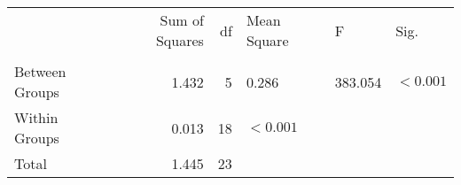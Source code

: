 \begin{tabular}{lrrlll}
\toprule
 & Sum of Squares & df & Mean Square & F & Sig. \\
 &  &  &  &  &  \\
\midrule
Between Groups & 1.432 & 5 & 0.286 & 383.054 & $< 0.001$ \\
Within Groups & 0.013 & 18 & $< 0.001$ &  &  \\
Total & 1.445 & 23 &  &  &  \\
\bottomrule
\end{tabular}
